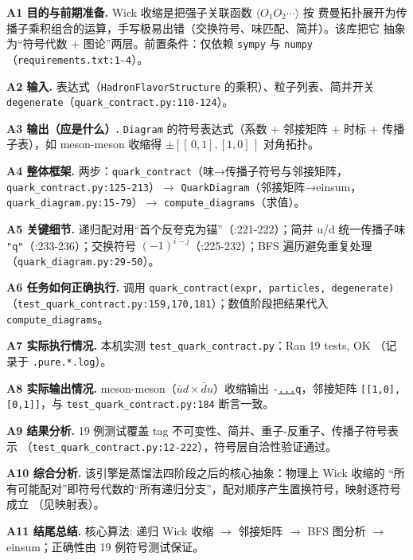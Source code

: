\documentclass[UTF8]{ctexart}
\begin{document}
\textbf{A1 目的与前期准备.} Wick 收缩是把强子关联函数 $\langle O_1O_2\cdots\rangle$ 按
费曼拓扑展开为传播子乘积组合的运算，手写极易出错（交换符号、味匹配、简并）。该库把它
抽象为``符号代数 + 图论''两层。前置条件：仅依赖 \texttt{sympy} 与 \texttt{numpy}
（\texttt{\nolinkurl{requirements.txt:1-4}}）。

\textbf{A2 输入.} 表达式（\texttt{HadronFlavorStructure} 的乘积）、粒子列表、简并开关
\texttt{degenerate}（\texttt{\nolinkurl{quark_contract.py:110-124}}）。

\textbf{A3 输出（应是什么）.} \texttt{Diagram} 的符号表达式（系数 + 邻接矩阵 + 时标 +
传播子表），如 meson-meson 收缩得
$\pm[\![\,0,1],[1,0]\,]$ 对角拓扑。

\textbf{A4 整体框架.} 两步：\texttt{\nolinkurl{quark_contract}}（味→传播子符号与邻接矩阵，
\texttt{\nolinkurl{quark_contract.py:125-213}}）$\to$ \texttt{QuarkDiagram}（邻接矩阵→einsum，
\texttt{\nolinkurl{quark_diagram.py:15-79}}）$\to$ \texttt{\nolinkurl{compute_diagrams}}（求值）。

\textbf{A5 关键细节.} 递归配对用``首个反夸克为锚''（:221-222）；简并 u/d 统一传播子味
\texttt{"q"}（:233-236）；交换符号 $(-1)^{i-j}$（:225-232）；BFS 遍历避免重复处理
（\texttt{\nolinkurl{quark_diagram.py:29-50}}）。



\textbf{A6 任务如何正确执行.} 调用 \texttt{quark\_contract(expr, particles, degenerate)}
（\texttt{\nolinkurl{test_quark_contract.py:159,170,181}}）；数值阶段把结果代入
\texttt{\nolinkurl{compute_diagrams}}。

\textbf{A7 实际执行情况.} 本机实测 \texttt{\nolinkurl{test_quark_contract.py}}：Ran 19 tests, OK
（记录于 \texttt{.pure.*.log}）。

\textbf{A8 实际输出情况.} meson-meson（$\bar u d\times\bar d u$）收缩输出
\texttt{-\url{...}q}，邻接矩阵 \texttt{[[1,0],[0,1]]}，与 \texttt{\nolinkurl{test_quark_contract.py:184}}
断言一致。

\textbf{A9 结果分析.} 19 例测试覆盖 tag 不可变性、简并、重子-反重子、传播子符号表示
（\texttt{\nolinkurl{test_quark_contract.py:12-222}}），符号层自洽性验证通过。

\textbf{A10 综合分析.} 该引擎是蒸馏法四阶段之后的核心抽象：物理上 Wick 收缩的
``所有可能配对''即符号代数的``所有递归分支''，配对顺序产生置换符号，映射逐符号成立
（见映射表）。

\textbf{A11 结尾总结.} \textcolor{algo}{核心算法:} 递归 Wick 收缩 $\to$ 邻接矩阵 $\to$
BFS 图分析 $\to$ einsum；正确性由 19 例符号测试保证。
\end{document}
